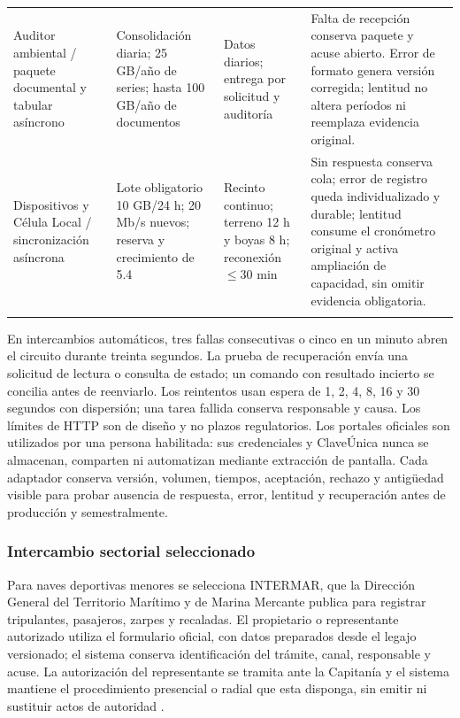 \begin{longtable}{@{}L{.19\textwidth}L{.26\textwidth}L{.20\textwidth}L{\dimexpr.35\textwidth-18pt\relax}@{}}
Auditor ambiental / paquete documental y tabular asíncrono & Consolidación diaria; 25 GB/año de series; hasta 100 GB/año de documentos & Datos diarios; entrega por solicitud y auditoría & Falta de recepción conserva paquete y acuse abierto. Error de formato genera versión corregida; lentitud no altera períodos ni reemplaza evidencia original. \\\addlinespace\hline
Dispositivos y Célula Local / sincronización asíncrona & Lote obligatorio 10 GB/24 h; 20 Mb/s nuevos; reserva y crecimiento de 5.4 & Recinto continuo; terreno 12 h y boyas 8 h; reconexión $\leq30$ min & Sin respuesta conserva cola; error de registro queda individualizado y durable; lentitud consume el cronómetro original y activa ampliación de capacidad, sin omitir evidencia obligatoria. \\\addlinespace\hline
\end{longtable}
\endgroup

En intercambios automáticos, tres fallas consecutivas o cinco en un minuto abren el circuito durante treinta segundos. La prueba de recuperación envía una solicitud de lectura o consulta de estado; un comando con resultado incierto se concilia antes de reenviarlo. Los reintentos usan espera de 1, 2, 4, 8, 16 y 30 segundos con dispersión; una tarea fallida conserva responsable y causa. Los límites de HTTP son de diseño y no plazos regulatorios. Los portales oficiales son utilizados por una persona habilitada: sus credenciales y ClaveÚnica nunca se almacenan, comparten ni automatizan mediante extracción de pantalla. Cada adaptador conserva versión, volumen, tiempos, aceptación, rechazo y antigüedad visible para probar ausencia de respuesta, error, lentitud y recuperación antes de producción y semestralmente.

\subsubsection{Intercambio sectorial seleccionado}
\label{subsec:sd5_sectorial_cierre}

Para naves deportivas menores se selecciona INTERMAR, que la Dirección General del Territorio Marítimo y de Marina Mercante publica para registrar tripulantes, pasajeros, zarpes y recaladas. El propietario o representante autorizado utiliza el formulario oficial, con datos preparados desde el legajo versionado; el sistema conserva identificación del trámite, canal, responsable y acuse. La autorización del representante se tramita ante la Capitanía y el sistema mantiene el procedimiento presencial o radial que esta disponga, sin emitir ni sustituir actos de autoridad \parencite{directemar-intermar}.

